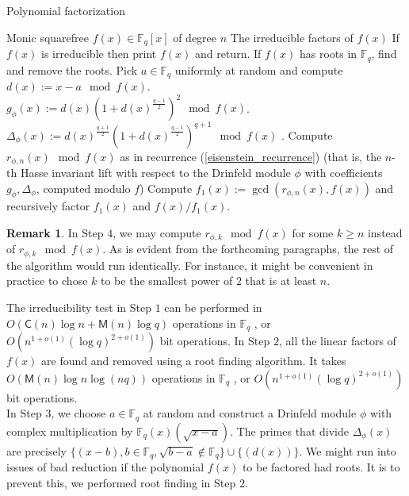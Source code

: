 \documentclass[12pt]{article}
\theoremstyle{plain}
\theoremstyle{definition}
\newtheorem*{remark}{Remark}
\def\F{\ensuremath{\mathbb{F}}}
\def\K{\ensuremath{\mathbb{K}}}
\def\MM{\ensuremath{\mathsf{M}}}
\def\CC{\ensuremath{\mathsf{C}}}
\newcommand{\D}{\Delta}
\begin{document}
\begin{algorithm}[H]
	\caption{Polynomial factorization}
	\label{factoring_algorithm}
	\begin{algorithmic}[1]
		\REQUIRE Monic squarefree $f(x) \in \F_q[x]$ of degree $n$
		\ENSURE The irreducible factors of $f(x)$
		\STATE If $f(x)$ is irreducible then print $f(x)$ and return.
		\STATE If $f(x)$ has roots in $\F_q$, find and remove the roots.
		\STATE Pick $a \in \F_q$ uniformly at random and compute \\ %
		$d(x) := x-a \mod f(x)$. \\
		$g_\phi(x) := d(x)(1+d(x)^{\frac{q-1}{2}})^2 \mod f(x)$. \\
		$\Delta_\phi(x) := d(x)^{\frac{q+1}{2}}(1+d(x)^{\frac{q-1}{2}})^{q+1} \mod f(x)$ .
		\STATE Compute $r_{\phi,n}(x) \mod f(x)$ as in recurrence (\ref{eisenstein_recurrence}) 
		(that is, the $n$-th Hasse invariant lift with respect to the Drinfeld module $\phi$ with 
		coefficients $g_\phi, \Delta_\phi$, computed modulo $f$)
		\STATE Compute $f_1(x) := \gcd(r_{\phi,n}(x), f(x))$ and recursively factor $f_1(x)$ and $f(x)/f_1(x)$.
	\end{algorithmic}
\end{algorithm}

\begin{remark}
	In Step $4$, we may compute $r_{\phi,k} \mod f(x)$ for some $k\geq n$ instead of $r_{\phi,k} \mod f(x)$. As is evident from the forthcoming paragraphs, the rest of the algorithm would run identically. For instance, it might be convenient in practice to chose $k$ to be the smallest power of $2$ that is at least $n$.
\end{remark}


The irreducibility test in Step $1$ can be performed in $O(\CC(n)\log n + \MM(n)\log q)$ operations 
in $\F_q$ \cite{vzGG}, or $O(n^{1+o(1)} (\log q)^{2+o(1)})$ bit operations. In Step $2$, all the 
linear factors of $f(x)$ are found and removed using a root finding algorithm. It takes 
$O(\MM(n)\log n \log(nq))$ operations in $\F_q$ \cite{vzGG}, or $O(n^{1+o(1)} (\log q)^{2+o(1)})$ 
bit operations. \\

 In Step $3$, we choose $a \in \F_q$ at random and construct a Drinfeld module $\phi$ with complex 
 multiplication by $\F_q(x)(\sqrt{x-a})$. The primes that divide $\D_\phi(x)$ are precisely 
 $\{(x-b),  b \in \F_q, \sqrt{b-a} \notin \F_q\} \cup \{(d(x))\}$. We might run into issues of bad 
 reduction if the polynomial $f(x)$ to be factored had roots. It is to prevent this, we performed 
 root finding in Step $2$. \\
\end{document}
